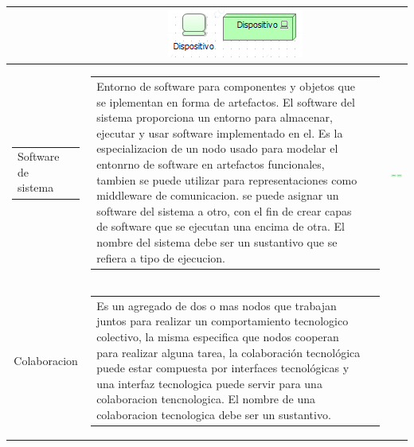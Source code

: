 \begin{longtable}{|c|c|c|}
\begin{tabular}{p{8cm}p{3cm}}
	\end{tabular}
	& \includegraphics[width=0.2\linewidth, height=0.05\textheight]{imgs/conceptos/tecnologica/dispositivo}
	\\
	\hline
	
	\begin{tabular}{p{2cm}p{3cm}}
		Software de sistema
	\end{tabular}
	&
	\begin{tabular}{p{8cm}p{3cm}} 
		Entorno de software para componentes y objetos que se iplementan en forma de artefactos.
		El software del sistema proporciona un entorno para almacenar, ejecutar y usar software implementado en el.
		Es la especializacion de un nodo usado para modelar el entonrno de software en artefactos funcionales, tambien se puede utilizar
		para representaciones como middleware de comunicacion.
		se puede asignar un software del sistema a otro, con el fin de crear capas de software que se ejecutan una encima de otra. 
		El nombre del sistema debe ser un sustantivo que se refiera a tipo de ejecucion.
		
	\end{tabular}
	& \includegraphics[width=0.2\linewidth, height=0.05\textheight]{imgs/conceptos/tecnologica/software}
	\\
	\hline
	
	Colaboracion
	&
	\begin{tabular}{p{8cm}p{3cm}} 
		Es un agregado de dos o mas nodos que trabajan juntos para realizar un comportamiento tecnologico colectivo, la misma especifica que nodos
		cooperan para realizar alguna tarea, la colaboración tecnológica puede estar compuesta por interfaces tecnológicas y una interfaz tecnologica puede servir para una colaboracion tencnologica. El nombre de una colaboracion tecnologica debe ser un sustantivo.
		

\end{tabular}
\end{longtable}
